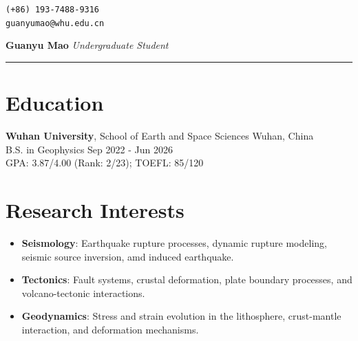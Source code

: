 \documentclass[a4paper, 10pt]{article}
\begin{document}
\begin{flushright}
  \texttt{(+86) 193-7488-9316} \\
  \texttt{guanyumao@whu.edu.cn} \\
\end{flushright}\vspace{-45pt}

\begin{flushleft}
  \huge \textbf{Guanyu Mao} \quad \large \textit{Undergraduate Student} \\
  \noindent\rule{\textwidth}{0.4pt}
\end{flushleft}

\section*{Education}
\noindent \textbf{Wuhan University}, School of Earth and Space Sciences \hfill Wuhan, China \\
B.S. in Geophysics \hfill Sep 2022 - Jun 2026 \\
GPA: 3.87/4.00 (Rank: 2/23); TOEFL: 85/120

\section*{Research Interests}
\begin{itemize}
    \item \textbf{Seismology}: Earthquake rupture processes, dynamic rupture modeling, seismic source inversion, amd induced earthquake.
    \item \textbf{Tectonics}: Fault systems, crustal deformation, plate boundary processes, and volcano-tectonic interactions.
    \item \textbf{Geodynamics}: Stress and strain evolution in the lithosphere, crust-mantle interaction, and deformation mechanisms.
\end{itemize}

\end{document}
